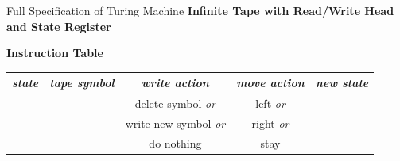\documentclass[xcolor={usenames,svgnames,x11names,dvipsnames,table}]{beamer}
\begin{document}
\begin{frame}{Full Specification of Turing Machine}
    \textbf{Infinite Tape with Read/Write Head and State Register}
    \begin{center}
    \end{center}

    \bigskip
    \textbf{Instruction Table}
    \begin{center}
        \begin{tabular}{cc|ccc}
            \emph{state} & \emph{tape symbol} & \emph{write action}        & \emph{move action} & \emph{new state}\\
            \hline
                         &                    & delete symbol \emph{or}    & left \emph{or}     & \\
                         &                    & write new symbol \emph{or} & right \emph{or}    & \\
                         &                    & do nothing                 & stay               & 
        \end{tabular}
    \end{center}
\end{frame}
\end{document}
